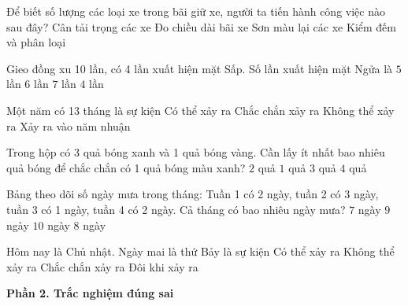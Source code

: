 \begin{ex} %
Để biết số lượng các loại xe trong bãi giữ xe, người ta tiến hành công việc nào sau đây?
\choice
{Cân tải trọng các xe}
{Đo chiều dài bãi xe}
{Sơn màu lại các xe}
{\True Kiểm đếm và phân loại}
\end{ex}

\begin{ex} %
Gieo đồng xu 10 lần, có 4 lần xuất hiện mặt Sấp. Số lần xuất hiện mặt Ngửa là
\choice
{$5$ lần}
{\True $6$ lần}
{$7$ lần}
{$4$ lần}
\end{ex}

\begin{ex} %
Một năm có 13 tháng là sự kiện
\choice
{Có thể xảy ra}
{Chắc chắn xảy ra}
{\True Không thể xảy ra}
{Xảy ra vào năm nhuận}
\end{ex}

\begin{ex} %
Trong hộp có 3 quả bóng xanh và 1 quả bóng vàng. Cần lấy ít nhất bao nhiêu quả bóng để chắc chắn có 1 quả bóng màu xanh?
\choice
{\True $2$ quả}
{$1$ quả}
{$3$ quả}
{$4$ quả}
\end{ex}

\begin{ex} %
Bảng theo dõi số ngày mưa trong tháng: Tuần 1 có 2 ngày, tuần 2 có 3 ngày, tuần 3 có 1 ngày, tuần 4 có 2 ngày. Cả tháng có bao nhiêu ngày mưa?
\choice
{$7$ ngày}
{$9$ ngày}
{$10$ ngày}
{\True $8$ ngày}
\end{ex}

\begin{ex} %
Hôm nay là Chủ nhật. Ngày mai là thứ Bảy là sự kiện
\choice
{Có thể xảy ra}
{\True Không thể xảy ra}
{Chắc chắn xảy ra}
{Đôi khi xảy ra}
\end{ex}

\textbf{Phần 2. Trắc nghiệm đúng sai}

